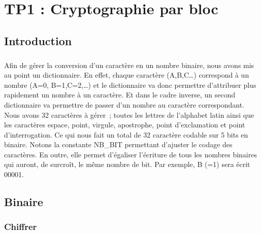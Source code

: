 \documentclass[11pt,fleqn]{book} %
\begin{document}
\chapter{TP1 : Cryptographie par bloc}



\section{Introduction}

\paragraph{}Afin de gérer la conversion d'un caractère en un nombre binaire, nous avons mis au point un dictionnaire. En effet, chaque caractère (A,B,C…) correspond à un nombre (A=0, B=1,C=2,…) et le dictionnaire va donc permettre d'attribuer plus rapidement un nombre à un caractère. Et dans le cadre inverse, un second dictionnaire va permettre de passer d'un nombre au caractère correspondant.
\vspace{0.5cm} Nous avons 32 caractères à gérer ; toutes les lettres de l'alphabet latin ainsi que les caractères espace, point, virgule, apostrophe, point d'exclamation et point d'interrogation. Ce qui nous fait un total de 32 caractère codable sur 5 bits en binaire. Notons la constante NB\_BIT permettant d'ajuster le codage des caractères. En outre, elle permet d’égaliser l'écriture de tous les nombres binaires qui auront, de surcroît, le même nombre de bit. Par exemple, B (=1) sera écrit 00001.

\section{Binaire}

\subsection{Chiffrer}
\end{document}
